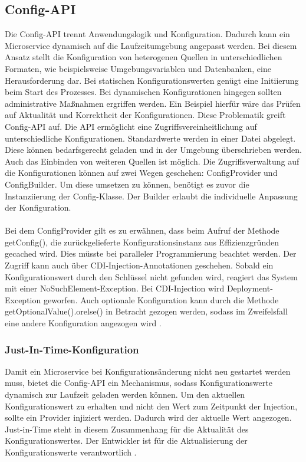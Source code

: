 \subsection{Config-API} 
Die Config-API trennt Anwendungslogik und Konfiguration. Dadurch kann ein Microservice dynamisch auf die Laufzeitumgebung angepasst werden. Bei diesem Ansatz stellt die Konfiguration von heterogenen Quellen in unterschiedlichen Formaten, wie beispielsweise Umgebungsvariablen und Datenbanken, eine Herausforderung dar. Bei statischen Konfigurationswerten genügt eine Initiierung beim Start des Prozesses. Bei dynamischen Konfigurationen hingegen sollten administrative Maßnahmen ergriffen werden. Ein Beispiel hierfür wäre das Prüfen auf Aktualität und Korrektheit der Konfigurationen. 
Diese Problematik greift Config-API auf. Die API ermöglicht eine Zugriffsvereinheitlichung auf unterschiedliche Konfigurationen. Standardwerte werden in einer Datei abgelegt. Diese können bedarfsgerecht geladen und in der Umgebung überschrieben werden. Auch das Einbinden von weiteren Quellen ist möglich.
Die Zugriffsverwaltung auf die Konfigurationen können auf zwei Wegen geschehen: ConfigProvider und ConfigBuilder. Um diese umsetzen zu können, benötigt es zuvor die Instanziierung der Config-Klasse. Der Builder erlaubt die individuelle Anpassung der Konfiguration. \\ \\ Bei dem ConfigProvider gilt es zu erwähnen, dass beim Aufruf der Methode getConfig(), die zurückgelieferte Konfigurationsinstanz aus Effizienzgründen gecached wird. Dies müsste bei paralleler Programmierung beachtet werden. Der Zugriff kann auch über CDI-Injection-Annotationen geschehen. Sobald ein Konfigurationswert durch den Schlüssel nicht gefunden wird, reagiert das System mit einer NoSuchElement-Exception. Bei CDI-Injection wird Deployment-Exception geworfen. Auch optionale Konfiguration kann durch die Methode getOptionalValue().orelse() in Betracht gezogen werden, sodass im Zweifelsfall eine andere Konfiguration angezogen wird \cite{LarsRowekamp.2017}. 

\subsubsection{Just-In-Time-Konfiguration} 
Damit ein Microservice bei Konfigurationsänderung nicht neu gestartet werden muss, bietet die Config-API ein Mechanismus, sodass Konfigurationswerte dynamisch zur Laufzeit geladen werden können. Um den aktuellen Konfigurationswert zu erhalten und nicht den Wert zum Zeitpunkt der Injection, sollte ein Provider injiziert werden. Dadurch wird der aktuelle Wert angezogen. Just-in-Time steht in diesem Zusammenhang für die Aktualität des Konfigurationswertes. Der Entwickler ist für die Aktualisierung der Konfigurationswerte verantwortlich \cite{LarsRowekamp.2017}. 

